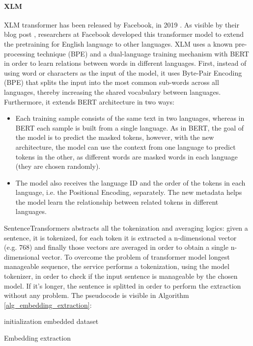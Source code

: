 \documentclass[\main/main.tex]{subfiles}
\begin{document}
\paragraph{XLM}
XLM transformer has been released by Facebook, in 2019 \cite{DBLP:journals/corr/abs-1901-07291}. As visible by their blog post \cite{xlm_blog_post}, researchers at Facebook developed this transformer model to extend the pretraining for English language to other languages. XLM uses a known pre-processing technique (BPE) and a dual-language training mechanism with BERT in order to learn relations between words in different languages. First, instead of using word or characters as the input of the model, it uses Byte-Pair Encoding (BPE) that splits the input into the most common sub-words across all languages, thereby increasing the shared vocabulary between languages. Furthermore, it extends BERT architecture in two ways:
\begin{itemize}
    \item Each training sample consists of the same text in two languages, whereas in BERT each sample is built from a single language. As in BERT, the goal of the model is to predict the masked tokens, however, with the new architecture, the model can use the context from one language to predict tokens in the other, as different words are masked words in each language (they are chosen randomly).
    \item The model also receives the language ID and the order of the tokens in each language, i.e. the Positional Encoding, separately. The new metadata helps the model learn the relationship between related tokens in different languages.
\end{itemize}


SentenceTransformers abstracts all the tokenization and averaging logics: given a sentence, it is tokenized, for each token it is extracted a n-dimensional vector (e.g. 768) and finally those vectors are averaged in order to obtain a single n-dimensional vector. To overcome the problem of transformer model longest manageable sequence, the service performs a tokenization, using the model tokenizer, in order to check if the input sentence is manageable by the chosen model. If it's longer, the sentence is splitted in order to perform the extraction without any problem. The pseudocode is visible in Algorithm \ref{alg_embedding_extraction}:
\begin{center}
    \begin{algorithm}[H]
     initialization
     \Return embedded dataset
     \caption{Embedding extraction}
     \label{alg_embedding_extraction}
    \end{algorithm}
\end{center}
\end{document}
